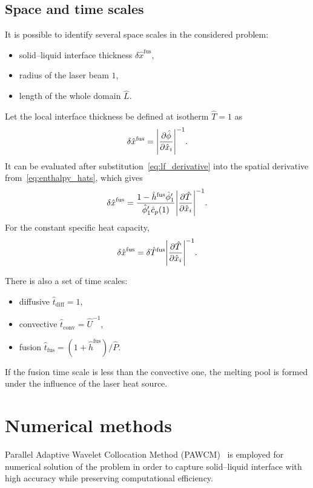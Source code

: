 \documentclass{article}
\newcommand{\fusion}[1]{{#1}^\mathrm{fus}}
\newcommand{\Hx}{\hat{x}}
\newcommand{\Ht}{\hat{t}}
\newcommand{\Hh}{\hat{h}}
\newcommand{\HT}{\hat{T}}
\newcommand{\HP}{\hat{P}}
\newcommand{\Hc}{\hat{c}}
\newcommand{\Hphi}{\hat{\phi}}
\newcommand{\HU}{\hat{U}}
\newcommand{\HL}{\hat{L}}
\begin{document}
\subsection{Space and time scales}

It is possible to identify several space scales in the considered problem:
\begin{itemize}
    \item solid--liquid interface thickness \(\delta\fusion{\Hx}\),
    \item radius of the laser beam \(1\),
    \item length of the whole domain \(\HL\).
\end{itemize}

Let the local interface thickness be defined at isotherm \(\HT=1\) as
\begin{equation}\label{eq:thickness_def}
    \delta\fusion{\Hx} = \qty|\pdv{\Hphi}{\Hx_i}|^{-1}.
\end{equation}
It can be evaluated after substitution~\eqref{eq:lf_derivative} into the spatial derivative from~\eqref{eq:enthalpy_hats}, which gives
\begin{equation}\label{eq:thickness_general}
    \fusion{\delta\Hx} = \frac{1-\fusion{\Hh}\Hphi'_1}{\Hphi'_1\Hc_p(1)}\qty|\pdv{\HT}{\Hx_i}|^{-1}.
\end{equation}
For the constant specific heat capacity,
\begin{equation}\label{eq:thickness_const}
    \fusion{\delta\Hx} = \delta\fusion{\HT}\qty|\pdv{\HT}{\Hx_i}|^{-1}.
\end{equation}

There is also a set of time scales:
\begin{itemize}
    \item diffusive \(\Ht_\mathrm{diff} = 1\),
    \item convective \(\Ht_\mathrm{conv} = \HU^{-1}\),
    \item fusion \(\Ht_\mathrm{fus} = (1+\fusion{\Hh})/\HP\).
\end{itemize}
If the fusion time scale is less than the convective one, the melting pool is formed under the influence of the laser heat source.

\section{Numerical methods}

Parallel Adaptive Wavelet Collocation Method (PAWCM)~\cite{Vasilyev2015} is employed for numerical solution of the problem
in order to capture solid--liquid interface with high accuracy while preserving computational efficiency.
\end{document}
